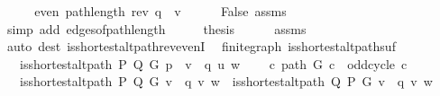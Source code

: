 \begin{isabellebody}
\ \ \isamarkupfalse%
\ \isamarkupfalse%
\ {\isachardoublequoteopen}even\ {\isacharparenleft}{\kern0pt}path{\isacharunderscore}{\kern0pt}length\ {\isacharparenleft}{\kern0pt}rev\ q\ {\isacharat}{\kern0pt}\ {\isacharbrackleft}{\kern0pt}v{\isacharbrackright}{\kern0pt}{\isacharparenright}{\kern0pt}{\isacharparenright}{\kern0pt}{\isachardoublequoteclose}\isanewline
\ \ \ \ \isamarkupfalse%
\ False\ assms{\isacharparenleft}{\kern0pt}{}{\isacharparenright}{\kern0pt}\isanewline
\ \ \ \ \isamarkupfalse%
\ {\isacharparenleft}{\kern0pt}simp\ add{\isacharcolon}{\kern0pt}\ edges{\isacharunderscore}{\kern0pt}of{\isacharunderscore}{\kern0pt}path{\isacharunderscore}{\kern0pt}length{\isacharparenright}{\kern0pt}\isanewline
\ \ \isamarkupfalse%
\ \isamarkupfalse%
\ {\isacharquery}{\kern0pt}thesis\isanewline
\ \ \ \ \isamarkupfalse%
\ assms{\isacharparenleft}{\kern0pt}{}{\isacharparenright}{\kern0pt}\isanewline
\ \ \ \ \isamarkupfalse%
\ {\isacharparenleft}{\kern0pt}auto\ dest{\isacharcolon}{\kern0pt}\ is{\isacharunderscore}{\kern0pt}shortest{\isacharunderscore}{\kern0pt}alt{\isacharunderscore}{\kern0pt}path{\isacharunderscore}{\kern0pt}rev{\isacharunderscore}{\kern0pt}evenI{\isacharparenright}{\kern0pt}\isanewline
{}\isamarkupfalse%
%
\endisatagproof
{\isafoldproof}%
%
\isadelimproof
\isanewline
%
\endisadelimproof
\isanewline
{}\isamarkupfalse%
\ {\isacharparenleft}{\kern0pt}\ finite{\isacharunderscore}{\kern0pt}graph{\isacharparenright}{\kern0pt}\ is{\isacharunderscore}{\kern0pt}shortest{\isacharunderscore}{\kern0pt}alt{\isacharunderscore}{\kern0pt}path{\isacharunderscore}{\kern0pt}suf{\isacharcolon}{\kern0pt}\isanewline
\ \ \ {\isachardoublequoteopen}is{\isacharunderscore}{\kern0pt}shortest{\isacharunderscore}{\kern0pt}alt{\isacharunderscore}{\kern0pt}path\ P\ Q\ G\ {\isacharparenleft}{\kern0pt}p\ {\isacharat}{\kern0pt}\ v\ {\isacharhash}{\kern0pt}\ q{\isacharparenright}{\kern0pt}\ u\ w{\isachardoublequoteclose}\isanewline
\ \ \ {\isachardoublequoteopen}{\isasymnot}\ {\isacharparenleft}{\kern0pt}{\isasymexists}c{\isachardot}{\kern0pt}\ path\ G\ c\ {\isasymand}\ odd{\isacharunderscore}{\kern0pt}cycle\ c{\isacharparenright}{\kern0pt}{\isachardoublequoteclose}\isanewline
\ \ \ {\isachardoublequoteopen}is{\isacharunderscore}{\kern0pt}shortest{\isacharunderscore}{\kern0pt}alt{\isacharunderscore}{\kern0pt}path\ P\ Q\ G\ {\isacharparenleft}{\kern0pt}v\ {\isacharhash}{\kern0pt}\ q{\isacharparenright}{\kern0pt}\ v\ w\ {\isasymor}\ is{\isacharunderscore}{\kern0pt}shortest{\isacharunderscore}{\kern0pt}alt{\isacharunderscore}{\kern0pt}path\ Q\ P\ G\ {\isacharparenleft}{\kern0pt}v\ {\isacharhash}{\kern0pt}\ q{\isacharparenright}{\kern0pt}\ v\ w{\isachardoublequoteclose}\isanewline

\end{isabellebody}
